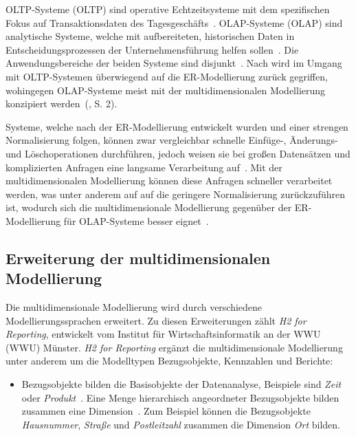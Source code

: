 \documentclass[
  language=german, %
  type=bachelor,%
  ngerman
]{isthesis}
\begin{document}
\begin{content}
  \acrlong{OLTP}-Systeme (\acrshort{OLTP}) sind operative Echtzeitsysteme mit dem
  spezifischen Fokus auf Transaktionsdaten des Tagesgeschäfts~\cite[][S.
  11]{gabriel2009data}. \acrlong{OLAP}-Systeme (\acrshort{OLAP}) sind analytische Systeme,
  welche mit aufbereiteten, historischen Daten in Entscheidungsprozessen der
  Unternehmensführung helfen sollen~\cite[][S. 1]{chaudhuri1997overview}. Die
  Anwendungsbereiche der beiden Systeme sind disjunkt~\cite[][S.
  334]{chamoni2000line}. Nach \textsc{\citeauthor{phipps2002automating}} wird
  im Umgang mit \acrshort{OLTP}-Systemen überwiegend auf die ER-Modellierung
  zurück gegriffen, wohingegen \acrshort{OLAP}-Systeme meist mit der
  multidimensionalen Modellierung konzipiert werden~(\citeyear{phipps2002automating}, S. 2). 

  Systeme, welche nach der ER-Modellierung entwickelt wurden und einer strengen
  Normalisierung folgen, können zwar vergleichbar schnelle Einfüge-, Änderungs- und
  Löschoperationen durchführen, jedoch weisen sie bei großen Datensätzen und
  komplizierten Anfragen eine langsame Verarbeitung auf~\cite[][S.
  52]{ballard2012dimensional}. Mit der multidimensionalen Modellierung können diese
  Anfragen schneller verarbeitet werden, was unter anderem auf auf die geringere Normalisierung zurückzuführen ist, wodurch
  sich die multidimensionale Modellierung gegenüber der ER-Modellierung für
  \acrshort{OLAP}-Systeme besser eignet~\cite[][S.  52]{ballard2012dimensional}.


	\subsection{Erweiterung der multidimensionalen Modellierung}

	Die multidimensionale Modellierung wird durch verschiedene
	Modellierungssprachen erweitert. Zu diesen Erweiterungen zählt \textit{H2 for
	Reporting}, entwickelt vom Institut für Wirtschaftsinformatik an der
	\acrlong{WWU} (WWU) Münster. \textit{H2
	for Reporting} ergänzt die multidimensionale Modellierung unter anderem um
	die Modelltypen Bezugsobjekte, Kennzahlen und Berichte:

	\begin{itemize}

		\item Bezugsobjekte bilden die Basisobjekte der Datenanalyse, Beispiele
		sind \textit{Zeit} oder \textit{Produkt}~\cite[][S.  5]{becker2007h2}. Eine
		Menge hierarchisch angeordneter Bezugsobjekte bilden zusammen eine
		Dimension~\cite[][S.  88]{becker2012fachkonzeptionelle}. Zum Beispiel
		können die Bezugsobjekte \textit{Hausnummer}, \textit{Straße} und
		\textit{Postleitzahl} zusammen die Dimension \textit{Ort} bilden.


\end{itemize}
\end{content}
\end{document}
